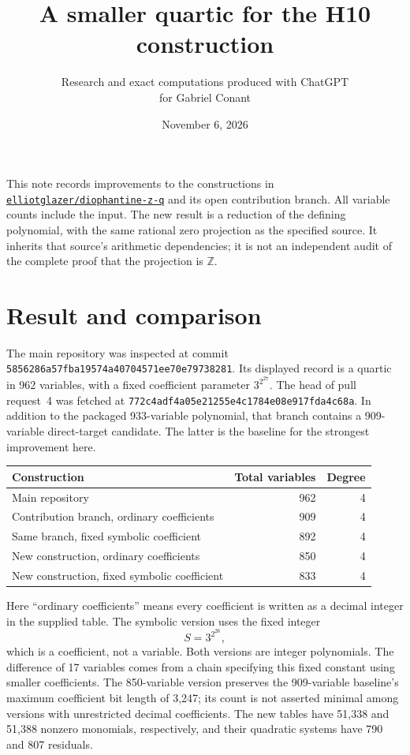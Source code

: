 \documentclass[11pt]{article}
\title{A smaller quartic for the H10 construction}
\author{Research and exact computations produced with ChatGPT\\for Gabriel Conant}
\date{November 6, 2026}
\newcommand{\Z}{\mathbb Z}
\begin{document}
\maketitle
\noindent This note records improvements to the constructions in
\href{https://github.com/elliotglazer/diophantine-z-q}{\texttt{elliotglazer/diophantine-z-q}}
and its open contribution branch. All variable counts include the input. The new result is a reduction of the defining polynomial, with the same rational zero projection as the specified source. It inherits that source's arithmetic dependencies; it is not an independent audit of the complete proof that the projection is $\Z$.

\section{Result and comparison}
The main repository was inspected at commit
\texttt{5856286a57fba19574a40704571ee70e79738281}.
Its displayed record is a quartic in 962 variables, with a fixed coefficient parameter $3^{2^{27}}$. The head of pull request~4 was fetched at
\texttt{772c4adf4a05e21255e4c1784e08e917fda4c68a}.
In addition to the packaged 933-variable polynomial, that branch contains a 909-variable direct-target candidate. The latter is the baseline for the strongest improvement here.

\begin{center}
\begin{tabular}{lrr}
\toprule
Construction & Total variables & Degree\\
\midrule
Main repository & 962 & 4\\
Contribution branch, ordinary coefficients & 909 & 4\\
Same branch, fixed symbolic coefficient & 892 & 4\\
New construction, ordinary coefficients & 850 & 4\\
New construction, fixed symbolic coefficient & 833 & 4\\
\bottomrule
\end{tabular}
\end{center}
Here ``ordinary coefficients'' means every coefficient is written as a decimal integer in the supplied table. The symbolic version uses the fixed integer
\[
 S=3^{2^{26}},
\]
which is a coefficient, not a variable. Both versions are integer polynomials. The difference of 17 variables comes from a chain specifying this fixed constant using smaller coefficients. The 850-variable version preserves the 909-variable baseline's maximum coefficient bit length of 3,247; its count is not asserted minimal among versions with unrestricted decimal coefficients. The new tables have 51,338 and 51,388 nonzero monomials, respectively, and their quadratic systems have 790 and 807 residuals.
\end{document}
